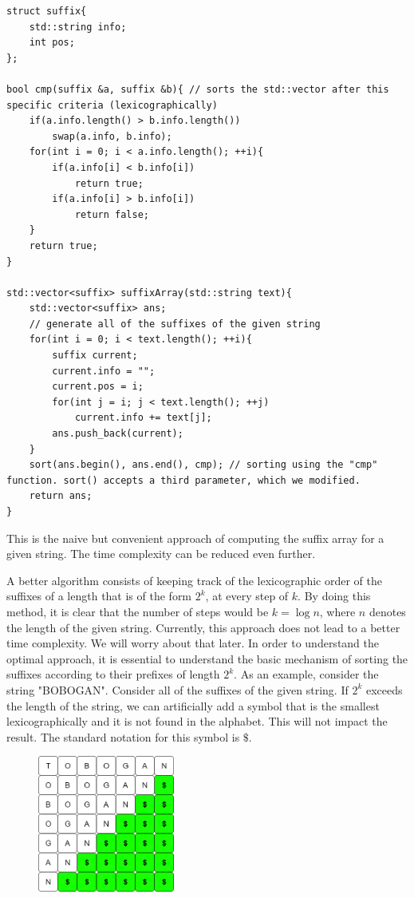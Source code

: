 \documentclass[letterpaper]{article}
\begin{document}
\begin{lstlisting}
struct suffix{
    std::string info; 
    int pos;
};

bool cmp(suffix &a, suffix &b){ // sorts the std::vector after this specific criteria (lexicographically)
    if(a.info.length() > b.info.length())
        swap(a.info, b.info);
    for(int i = 0; i < a.info.length(); ++i){
        if(a.info[i] < b.info[i])
            return true;
        if(a.info[i] > b.info[i])
            return false;
    }
    return true;
}

std::vector<suffix> suffixArray(std::string text){
    std::vector<suffix> ans;
    // generate all of the suffixes of the given string
    for(int i = 0; i < text.length(); ++i){
        suffix current;
        current.info = "";
        current.pos = i;
        for(int j = i; j < text.length(); ++j)
            current.info += text[j];
        ans.push_back(current);
    }
    sort(ans.begin(), ans.end(), cmp); // sorting using the "cmp" function. sort() accepts a third parameter, which we modified.
    return ans;
}
\end{lstlisting}

This is the naive but convenient approach of computing the suffix array for a given string. The time complexity can be reduced even further. 

A better algorithm consists of keeping track of the lexicographic order of the suffixes of a length that is of the form $2^k$, at every step of $k$. By doing this method, it is clear that the number of steps would be $k = \log n$, where $n$ denotes the length of the given string. Currently, this approach does not lead to a better time complexity. We will worry about that later. In order to understand the optimal approach, it is essential to understand the basic mechanism of sorting the suffixes according to their prefixes of length $2^k$. As an example, consider the string "BOBOGAN". Consider all of the suffixes of the given string. If $2^k$ exceeds the length of the string, we can artificially add a symbol that is the smallest lexicographically and it is not found in the alphabet. This will not impact the result. The standard notation for this symbol is $\$$.

\begin{figure} [h!]
\centering
\includegraphics[width=0.40\textwidth]{pngOfDiagrams/suffixarrayex1.png}
\end{figure}
\end{document}
